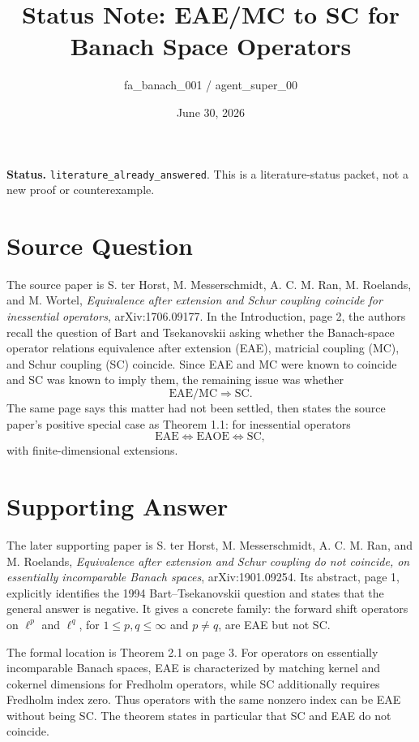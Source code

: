 \documentclass[11pt]{article}
\title{Status Note: EAE/MC to SC for Banach Space Operators}
\author{fa\_banach\_001 / agent\_super\_00}
\date{June 30, 2026}
\begin{document}
\maketitle

\noindent\textbf{Status.}
\texttt{literature\_already\_answered}. This is a literature-status packet,
not a new proof or counterexample.

\section*{Source Question}

The source paper is S. ter Horst, M. Messerschmidt, A. C. M. Ran,
M. Roelands, and M. Wortel, \emph{Equivalence after extension and Schur
coupling coincide for inessential operators}, arXiv:1706.09177. In the
Introduction, page 2, the authors recall the question of Bart and
Tsekanovskii asking whether the Banach-space operator relations equivalence
after extension (EAE), matricial coupling (MC), and Schur coupling (SC)
coincide. Since EAE and MC were known to coincide and SC was known to imply
them, the remaining issue was whether
\[
  \mathrm{EAE}/\mathrm{MC} \Longrightarrow \mathrm{SC}.
\]
The same page says this matter had not been settled, then states the source
paper's positive special case as Theorem 1.1: for inessential operators
\[
  \mathrm{EAE} \Longleftrightarrow \mathrm{EAOE} \Longleftrightarrow
  \mathrm{SC},
\]
with finite-dimensional extensions.

\section*{Supporting Answer}

The later supporting paper is S. ter Horst, M. Messerschmidt, A. C. M. Ran,
and M. Roelands, \emph{Equivalence after extension and Schur coupling do not
coincide, on essentially incomparable Banach spaces}, arXiv:1901.09254. Its
abstract, page 1, explicitly identifies the 1994 Bart--Tsekanovskii question
and states that the general answer is negative. It gives a concrete family:
the forward shift operators on $\ell^p$ and $\ell^q$, for $1 \leq p,q \leq
\infty$ and $p \neq q$, are EAE but not SC.

The formal location is Theorem 2.1 on page 3. For operators on essentially
incomparable Banach spaces, EAE is characterized by matching kernel and
cokernel dimensions for Fredholm operators, while SC additionally requires
Fredholm index zero. Thus operators with the same nonzero index can be EAE
without being SC. The theorem states in particular that SC and EAE do not
coincide.
\end{document}
